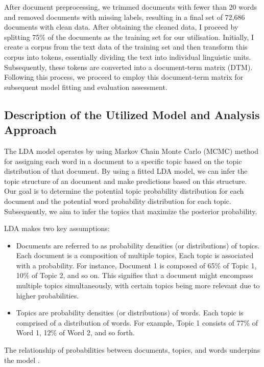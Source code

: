 \documentclass[12pt,twoside]{article}
\begin{document}
After document preprocessing, we trimmed documents with fewer than 20 words and removed documents with missing labels, resulting in a final set of 72,686 documents with clean data. After obtaining the cleaned data, I proceed by splitting 75\% of the documents as the training set for our utilisation. Initially, I create a corpus from the text data of the training set and then transform this corpus into tokens, essentially dividing the text into individual linguistic units. Subsequently, these tokens are converted into a document-term matrix (DTM). Following this process, we proceed to employ this document-term matrix for subsequent model fitting and evaluation assessment.

\subsection{Description of the Utilized Model and Analysis Approach}
The LDA model operates by using Markov Chain Monte Carlo (MCMC) method for assigning each word in a document to a specific topic based on the topic distribution of that document. By using a fitted LDA model, we can infer the topic structure of an document and make predictions based on this structure. Our goal is to determine the potential topic probability distribution for each document and the potential word probability distribution for each topic. Subsequently, we aim to infer the topics that maximize the posterior probability.

LDA makes two key assumptions:
\begin{itemize}
\item Documents are referred to as probability densities (or distributions) of topics. Each document is a composition of multiple topics, Each topic is associated with a probability. For instance, Document 1 is composed of 65\% of Topic 1, 10\% of Topic 2, and so on. This signifies that a document might encompass multiple topics simultaneously, with certain topics being more relevant due to higher probabilities. 

\item Topics are probability densities (or distributions) of words. Each topic is comprised of a distribution of words. For example, Topic 1 consists of 77\% of Word 1, 12\% of Word 2, and so forth. 
\end{itemize}
The relationship of probabilities between documents, topics, and words underpins the model \cite{Seth2021}.\\\\
\end{document}

